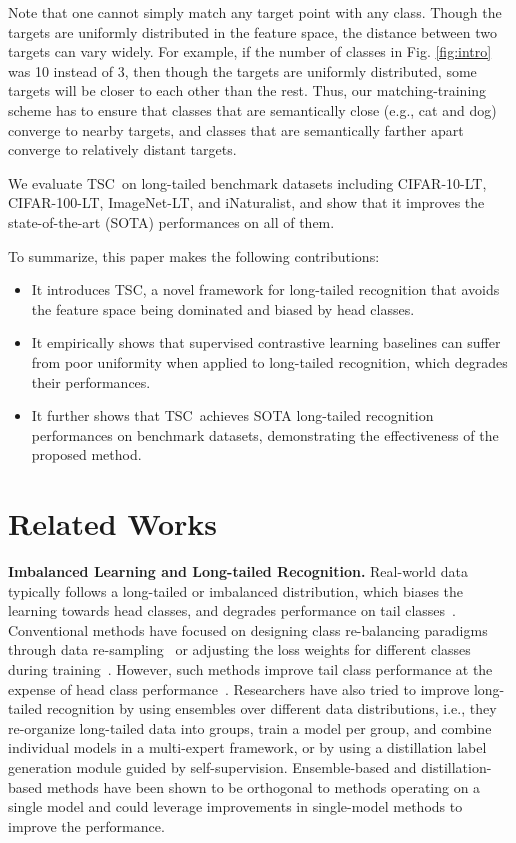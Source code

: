 \documentclass[10pt,twocolumn,letterpaper]{article}
\newcommand{\name} {TSC}
\newenvironment{Itemize}{
\setlength{\leftmargini}{9pt}\begin{itemize}\setlength{\itemsep}{0pt}\setlength{\topsep}{0pt}\setlength{\partopsep}{0pt}\setlength{\parskip}{0pt}}{\end{itemize}}
\begin{document}
Note that one cannot simply match any target point with any class. Though the targets are uniformly distributed in the feature space, the distance between two targets can vary widely. For example, if the number of classes in Fig. \ref{fig:intro} was 10 instead of 3, then though the targets are uniformly distributed, some targets will be closer to each other than the rest. Thus, our matching-training scheme has to ensure that classes that are semantically close (e.g., cat and dog)
converge to nearby targets, and classes that are semantically farther apart converge to relatively distant targets. 

We evaluate \name~on long-tailed benchmark datasets including CIFAR-10-LT, CIFAR-100-LT, ImageNet-LT, and iNaturalist, and show that it improves the state-of-the-art (SOTA) performances on all of them.
 
To summarize, this paper makes the following contributions:
\begin{Itemize}
    \item It introduces \name, a novel framework for long-tailed recognition that avoids the feature space being dominated and biased by head classes.
    \item It empirically shows that supervised contrastive learning baselines can suffer from poor uniformity when applied to long-tailed recognition, which degrades their performances.
    \item It further shows that \name~achieves SOTA long-tailed recognition performances on benchmark datasets, demonstrating the effectiveness of the proposed method.
\end{Itemize}



 \section{Related Works}

\textbf{Imbalanced Learning and Long-tailed Recognition.}
Real-world data typically follows a long-tailed or imbalanced distribution, which biases the learning towards head classes, and degrades performance on tail classes~\cite{yang2022multi, zhang2021deep}. Conventional methods have focused on designing class re-balancing paradigms through data re-sampling~\cite{chawla2002smote, shen2016relay, buda2018systematic, ando2017deep} or adjusting the loss weights for different classes during training~\cite{cao2019learning, cui2019class, dong2018imbalanced, khan2019striking, khan2017cost, byrd2019effect}. However, such methods improve tail class performance at the expense of head class performance~\cite{kang2019decoupling}.
Researchers have also tried to improve long-tailed recognition by using ensembles over different data distributions\cite{zhou2020bbn, wang2020long,zhang2021test}, i.e., they re-organize long-tailed data into groups, train a model per group, and combine individual models in a multi-expert framework, or by using a distillation label generation module guided by self-supervision\cite{li2021self}. Ensemble-based and distillation-based methods have been shown to be orthogonal to methods operating on a single model and could leverage improvements in single-model methods to improve the performance.
\end{document}
